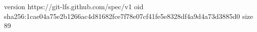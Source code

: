 version https://git-lfs.github.com/spec/v1
oid sha256:1cae04a75e2b1266ac4d81682fce7f78e07cf41fe5e8328df4a9d4a73d3885d0
size 89
